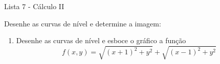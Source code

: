 \documentclass[11pt,a4paper]{article}
\begin{document}
	\begin{center}
		\Large Lista 7 - Cálculo II
	\end{center}
	
Desenhe as curvas de nível e determine a imagem:	
	
	\begin{enumerate}
		
		
		
Desenhe as curvas de nível e determine a imagem:
			\begin{enumerate}
			\item $f(x,y) = x - 2y$
				
				
				
				
				
				
				
				
				
				
				\item $f(x,y) = \displaystyle\frac{x - y}{x + y}$
				\item $\displaystyle\frac{x^2}{x^2 + y^2}$
				\item $3x^3 - 4xy + y^2$
				\item $f(x,y) = x^2 - y^2$
				\item $z = \displaystyle\frac{y}{x - 2} $
				\item $z = \displaystyle\frac{x}{y - 1} $
				\item $z = \displaystyle\frac{xy}{x^2 + y^2} $
			\end{enumerate}
			
			\item Desenhe as curvas de nível e esboce o gráfico a função
			$$f(x,y) = \sqrt{(x+1)^2 + y^2} + \sqrt{(x-1)^2 + y^2}$$			
			
			
			
			
			
			
			
			
			
			
			
			
			
			
			

\end{enumerate}
\end{document}
